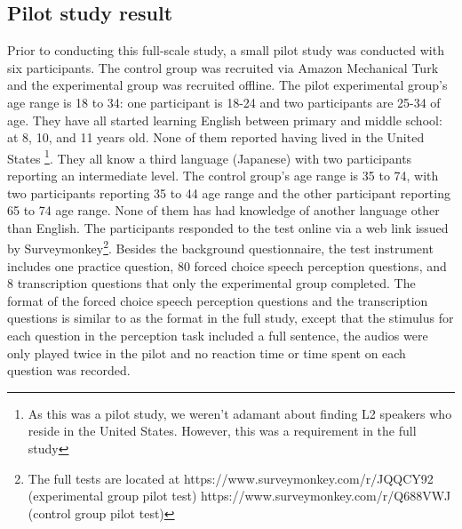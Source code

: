 \documentclass[a4paper]{article}
\begin{document}
\subsection{Pilot study result}


Prior to conducting this full-scale study, a small pilot study was conducted with six participants. The control group was recruited via Amazon Mechanical Turk and the experimental group was recruited offline. The pilot experimental group's age range is 18 to 34: one participant is 18-24 and two participants are 25-34 of age. They have all started learning English between primary and middle school: at 8, 10, and 11 years old. None of them reported having lived in the United States \footnote{As this was a pilot study, we weren't adamant about finding L2 speakers who reside in the United States. However, this was a requirement in the full study}. They all know a third language (Japanese) with two participants reporting an intermediate level. The control group's age range is 35 to 74, with two participants reporting 35 to 44 age range and the other participant reporting 65 to 74 age range. None of them has had knowledge of another language other than English. The participants responded to the test online via a web link issued by Surveymonkey\footnote{The full tests are located at https://www.surveymonkey.com/r/JQQCY92 (experimental group pilot test) https://www.surveymonkey.com/r/Q688VWJ (control group pilot test)}. Besides the background questionnaire, the test instrument includes one practice question, 80 forced choice speech perception questions, and 8 transcription questions that only the experimental group completed. The format of the forced choice speech perception questions and the transcription questions is similar to as the format in the full study, except that the stimulus for each question in the perception task included a full sentence, the audios were only played twice in the pilot and no reaction time or time spent on each question was recorded.
\end{document}
